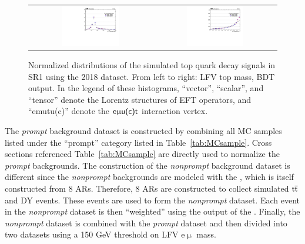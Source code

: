 \begin{figure}[tbh!]
 \begin{center}
 \begin{tabular}{cc}
 \includegraphics[width=0.48\textwidth]{figures/Part3/BDT/LFV_VR_emul_lllOffZMetg20Jetgeq1Bleq1_LFVTopmass_N}&
 \includegraphics[width=0.48\textwidth]{figures/Part3/BDT/LFV_VR_emul_lllOffZMetg20Jetgeq1Bleq1_BDT_TT_N}\\
 \end{tabular}
 \caption{Normalized distributions of the simulated top quark decay signals in \ac{SR}1 using the 2018 dataset. From left to right: LFV top mass, \ac{BDT} output. In the legend of these histograms, ``vector'', ``scalar'', and ``tensor'' denote the Lorentz structures of \ac{EFT} operators, and ``emutu(c)'' denote the $\textsf{e}\upmu\textsf{{u(c)}t}$ interaction vertex.}
 \label{fig:Lorentz}
 \end{center}
\end{figure}

The \emph{prompt} background dataset is constructed by combining all \ac{MC} samples listed under the ``prompt'' category listed in Table~\ref{tab:MCsample}. Cross sections referenced Table~\ref{tab:MCsample} are directly used to normalize the \emph{prompt} backgrounds. The construction of the \emph{nonprompt} background dataset is different since the \emph{nonprompt} backgrounds are modeled with the \mm, which is itself constructed from 8 \acp{AR}. Therefore, 8 \acp{AR} are constructed to collect simulated $\textsf{t}\overline{\textsf{t}}$ and \ac{DY} events. These events are used to form the \emph{nonprompt} dataset. Each event in the \emph{nonprompt} dataset is then ``weighted'' using the output of the \mm. Finally, the \emph{nonprompt} dataset is combined with the \emph{prompt} dataset and then divided into two datasets using a 150 GeV threshold on LFV e$\upmu$ mass. 

